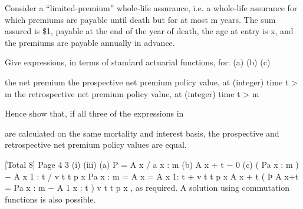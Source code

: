 \documentclass[a4paper,1pt]{article}
\begin{document}
Consider a “limited-premium” whole-life assurance, i.e. a whole-life assurance for
which premiums are payable until death but for at most m years. The sum
assured is \$1, payable at the end of the year of death, the age at entry is x, and
the premiums are payable annually in advance.
\item 
Give expressions, in terms of standard actuarial functions, for:
(a)
(b)
(c)
\item 
the net premium
the prospective net premium policy value, at (integer) time t > m
the retrospective net premium policy value, at (integer) time t > m

Hence show that, if all three of the expressions in \item  are calculated on the
same mortality and interest basis, the prospective and retrospective net
premium policy values are equal.

[Total 8]
Page 4 %
3
(i)
(iii)
(a) P = A x / a  x : m
(b) A x + t − 0
(c) ( Pa 
x : m
)
− A x 1 : t / v t t p x
Pa  x : m = A x = A x 1: t + v t t p x A x + t
(
Þ A x+t = Pa  x : m − A 1 x : t
)
v t t p x , as required.
A solution using commutation functions is also possible.
\end{document}
